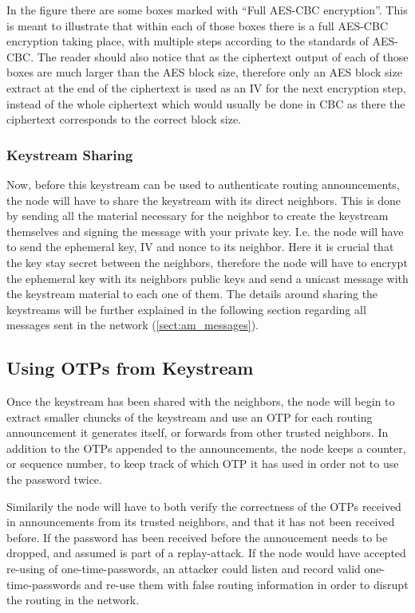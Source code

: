 In the figure there are some boxes marked with ``Full AES-CBC encryption''. This
is meant to illustrate that within each of those boxes there is a full AES-CBC
encryption taking place, with multiple steps according to the standards of
AES-CBC. The reader should also notice that as the ciphertext output of each of
those boxes are much larger than the AES block size, therefore only an AES block
size extract at the end of the ciphertext is used as an \ac{IV} for the next
encryption step, instead of the whole ciphertext which would usually be done in
CBC as there the ciphertext corresponds to the correct block size.

\subsubsection*{Keystream Sharing}
Now, before this keystream can be used to authenticate routing announcements,
the node will have to share the keystream with its direct neighbors. This is
done by sending all the material necessary for the neighbor to create the
keystream themselves and signing the message with your private key. I.e. the
node will have to send the ephemeral key, \ac{IV} and nonce to its neighbor.
Here it is crucial that the key stay secret between the neighbors, therefore
the node will have to encrypt the ephemeral key with its neighbors public keys
and send a unicast message with the keystream material to each one of them. The
details around sharing the keystreams will be further explained in the
following section regarding all messages sent in the network
(\ref{sect:am_messages}).

\subsection{Using \acfp{OTP} from Keystream}
Once the keystream has been shared with the neighbors, the node will begin to
extract smaller chuncks of the keystream and use an \ac{OTP} for each
routing announcement it generates itself, or forwards from other trusted
neighbors. In addition to the \acp{OTP} appended to the announcements,
the node keeps a counter, or sequence number, to keep track of which
\ac{OTP} it has used in order not to use the password twice.

Similarily the node will have to both verify the correctness of the \acp{OTP}
received in announcements from its trusted neighbors, and that it has not been
received before. If the password has been received before the annoucement needs
to be dropped, and assumed is part of a replay-attack. If the node would have
accepted re-using of one-time-passwords, an attacker could listen and record
valid one-time-passwords and re-use them with false routing information in
order to disrupt the routing in the network.

